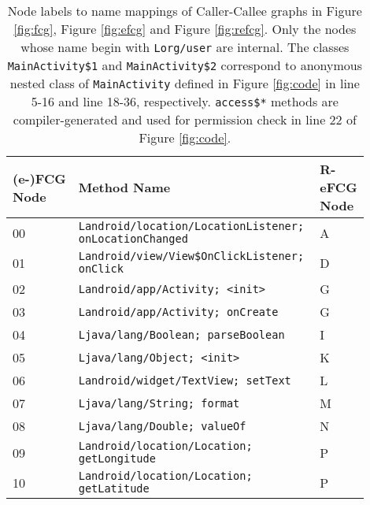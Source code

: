 \begin{table}[h]
\scriptsize
\caption{Node labels to name mappings of Caller-Callee graphs in Figure \ref{fig:fcg}, Figure \ref{fig:efcg} and Figure \ref{fig:refcg}. Only the nodes whose name begin with \texttt{Lorg/user} are internal. The classes \texttt{MainActivity\$1} and \texttt{MainActivity\$2} correspond to anonymous nested class of \texttt{MainActivity} defined in Figure \ref{fig:code} in line 5-16 and line 18-36, respectively. \texttt{access\$*} methods are compiler-generated and used for permission check in line 22 of Figure \ref{fig:code}. }
\begin{tabular}{@{}p{0.1\linewidth}p{0.7\linewidth}p{0.1\linewidth}@{}}
\toprule
(e-)FCG Node & Method Name                                                        & R-eFCG Node \\ \midrule
00                               & \texttt{Landroid/location/LocationListener; onLocationChanged}     & A           \\
01                               & \texttt{Landroid/view/View\$OnClickListener; onClick}               & D           \\
02                               & \texttt{Landroid/app/Activity; <init>}                             & G           \\
03                               & \texttt{Landroid/app/Activity; onCreate}                           & G           \\
04                               & \texttt{Ljava/lang/Boolean; parseBoolean}                          & I           \\
05                               & \texttt{Ljava/lang/Object; <init>}                                 & K           \\
06                               & \texttt{Landroid/widget/TextView; setText}                         & L           \\
07                               & \texttt{Ljava/lang/String; format}                                 & M           \\
08                               & \texttt{Ljava/lang/Double; valueOf}                                & N           \\
09                               & \texttt{Landroid/location/Location; getLongitude}                  & P           \\
10                               & \texttt{Landroid/location/Location; getLatitude}                   & P           \\

\end{tabular}
\end{table}
